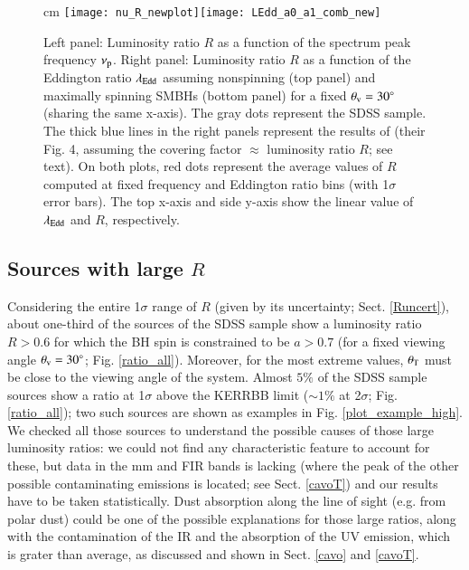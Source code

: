 \documentclass[]{aa}
\begin{document}

\begin{figure*}
\centering
{} cm
\texttt{[image: nu\_R\_newplot]}\texttt{[image: LEdd\_a0\_a1\_comb\_new]}
\caption{Left panel: Luminosity ratio $R$ as a function of the spectrum peak frequency $\nu_{\rm p}$. Right panel: Luminosity ratio $R$ as a function of the Eddington ratio $\lambda_{\rm Edd}$ assuming nonspinning (top panel) and maximally spinning SMBHs (bottom panel) for a fixed $\theta_{\rm v} = 30^{\circ}$ (sharing the same x-axis). The gray dots represent the SDSS sample. The thick blue lines in the right panels represent the results of \citet{Ricci} (their Fig. 4, assuming the covering factor $\approx$ luminosity ratio $R$; see text). On both plots, red dots represent the average values of $R$ computed at fixed frequency and Eddington ratio bins (with 1$\sigma$ error bars). The top x-axis and side y-axis show the linear value of $\lambda_{\rm Edd}$ and $R$, respectively.}
\label{nu_R}
\end{figure*}

\subsection{Sources with large $R$}\label{largeR}

Considering the entire 1$\sigma$ range of $R$ (given by its uncertainty; Sect. \ref{Runcert}), about one-third of the sources of the SDSS sample show a luminosity ratio $R>0.6$ for which the BH spin is constrained to be $a>0.7$ (for a fixed viewing angle $\theta_{\rm v} = 30^{\circ}$; Fig. \ref{ratio_all}). Moreover, for the most extreme values, $\theta_{\rm T}$ must be close to the viewing angle of the system. Almost $5 \%$ of the SDSS sample sources show a ratio at 1$\sigma$ above the KERRBB limit ($\sim 1 \%$ at 2$\sigma$; Fig. \ref{ratio_all}); two such sources are shown as examples in Fig. \ref{plot_example_high}. We checked all those sources to understand the possible causes of those large luminosity ratios: we could not find any characteristic feature to account for these, but data in the mm and FIR bands is lacking (where the peak of the other possible contaminating emissions is located; see Sect. \ref{cavoT}) and our results have to be taken statistically. Dust absorption along the line of sight (e.g. from polar dust) could be one of the possible explanations for those large ratios, along with the contamination of the IR and the absorption of the UV emission, which is grater than average, as discussed and shown in Sect. \ref{cavo} and \ref{cavoT}. 
\end{document}

